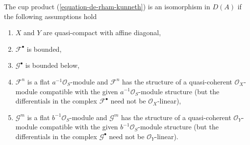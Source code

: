 \begin{lemma}
\label{lemma-kunneth-special}
The cup product (\ref{equation-de-rham-kunneth}) is an isomorphism in $D(A)$
if the following assumptions hold
\begin{enumerate}
\item $X$ and $Y$ are quasi-compact with affine diagonal,
\item $\mathcal{F}^\bullet$ is bounded,
\item $\mathcal{G}^\bullet$ is bounded below,
\item $\mathcal{F}^n$ is a flat $a^{-1}\mathcal{O}_S$-module and
$\mathcal{F}^n$ has the structure of a quasi-coherent $\mathcal{O}_X$-module
compatible with the given $a^{-1}\mathcal{O}_S$-module structure (but the
differentials in the complex $\mathcal{F}^\bullet$ need not
be $\mathcal{O}_X$-linear),
\item $\mathcal{G}^m$ is a flat $b^{-1}\mathcal{O}_S$-module and
$\mathcal{G}^m$ has the structure of a quasi-coherent $\mathcal{O}_Y$-module
compatible with the given $b^{-1}\mathcal{O}_S$-module structure (but the
differentials in the complex $\mathcal{G}^\bullet$ need not
be $\mathcal{O}_Y$-linear).
\end{enumerate}
\end{lemma}

